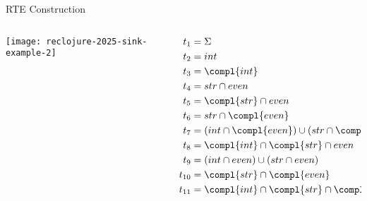 \begin{frame}{RTE Construction}
  \begin{columns}
    \begin{column}{0.5\textwidth}
      \texttt{[image: reclojure-2025-sink-example-2]}
    \end{column}
    \begin{column}{0.5\textwidth}
      \begin{align*}
        t_1 &= \Sigma\\
        t_2 &= int  \\
        t_3 &= \compl{int}\\
        t_4 &= str \cap even\\
        t_5 &= \compl{str} \cap even\\
        t_6 &= str \cap \compl{even}\\
        t_7 &= (int \cap \compl{even}) \cup (str \cap \compl{even})\\
        t_8 &=\compl{int} \cap \compl{str} \cap even\\
        t_9 &=(int \cap even) \cup (str \cap even)\\
        t_{10} &=\compl{str} \cap \compl{even}\\
        t_{11} &=\compl{int} \cap \compl{str} \cap \compl{even}
      \end{align*}
    \end{column}
  \end{columns}
\end{frame}

